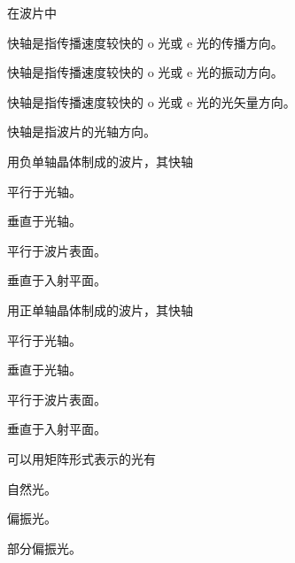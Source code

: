\documentclass[standard, analysis, notocnum]{ExBook}
\newcommand{\answerarea}[1][8cm]{%
  \par\vspace{2mm}%
  \noindent{\color{themeColor!35}\rule{\linewidth}{0.4pt}}\par
  \noindent\begin{minipage}[t][#1][t]{\linewidth}\vspace{0pt}\end{minipage}\par
  \noindent{\color{themeColor!35}\rule{\linewidth}{0.4pt}}\par
}
\begin{document}
\begin{qitems}
\begin{bbox}
\answerarea[3.5cm]
\end{bbox}
\begin{bbox}
\qitem 在波片中
\par\noindent\hspace{2em}快轴是指传播速度较快的 o 光或 e 光的传播方向。
\par\noindent\hspace{2em}快轴是指传播速度较快的 o 光或 e 光的振动方向。
\par\noindent\hspace{2em}快轴是指传播速度较快的 o 光或 e 光的光矢量方向。
\par\noindent\hspace{2em}快轴是指波片的光轴方向。
\answerarea[3.5cm]
\end{bbox}
\begin{bbox}
\qitem 用负单轴晶体制成的波片，其快轴
\par\noindent\hspace{2em}平行于光轴。
\par\noindent\hspace{2em}垂直于光轴。
\par\noindent\hspace{2em}平行于波片表面。
\par\noindent\hspace{2em}垂直于入射平面。
\answerarea[3.5cm]
\end{bbox}
\begin{bbox}
\qitem 用正单轴晶体制成的波片，其快轴
\par\noindent\hspace{2em}平行于光轴。
\par\noindent\hspace{2em}垂直于光轴。
\par\noindent\hspace{2em}平行于波片表面。
\par\noindent\hspace{2em}垂直于入射平面。
\answerarea[3.5cm]
\end{bbox}
\begin{bbox}
\qitem 可以用矩阵形式表示的光有
\par\noindent\hspace{2em}自然光。
\par\noindent\hspace{2em}偏振光。
\par\noindent\hspace{2em}部分偏振光。

\end{bbox}
\end{qitems}
\end{document}
